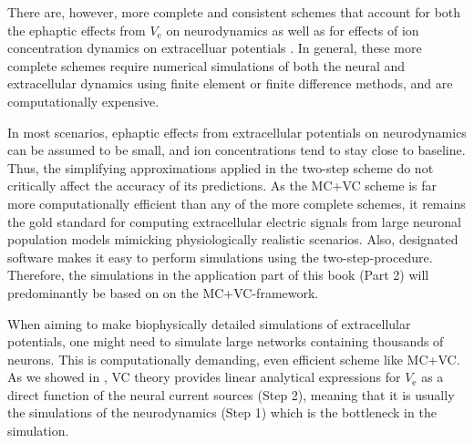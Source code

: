 There are, however, more complete and consistent schemes that account for both the ephaptic effects from $V_\text{e}$  on neurodynamics as well as for effects of ion concentration dynamics on extracelluar potentials
. 
In general, these more complete schemes require numerical simulations of both the neural and extracellular dynamics using finite element or finite difference methods, and are computationally expensive.

In most scenarios, ephaptic effects from extracellular potentials on neurodynamics can be assumed to be small, and ion concentrations tend to stay close to baseline. Thus, the simplifying approximations applied in the two-step scheme do not critically affect the accuracy of its predictions. As the MC+VC scheme is far more computationally efficient than any of the more complete schemes, it remains the gold standard for computing extracellular electric signals from large neuronal population models mimicking physiologically realistic scenarios. Also, designated software makes it easy to perform simulations using the two-step-procedure. Therefore, the simulations in the application part of this book (Part 2) will predominantly be based on on the MC+VC-framework.

When aiming to make biophysically detailed simulations of extracellular potentials, one might need to simulate large networks containing thousands of neurons. 
This is computationally demanding, even  efficient scheme like MC+VC.
 As we showed in , VC theory provides linear analytical expressions for $V_\text{e}$  as a direct function of the neural current sources (Step 2), meaning that it is usually the simulations of the neurodynamics (Step 1) which is the bottleneck in the simulation. 

